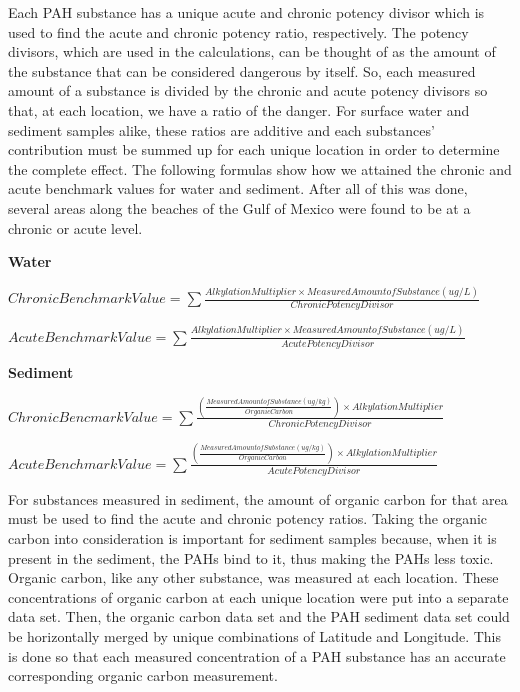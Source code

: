 \documentclass[authoryear,12pt]{elsarticle}
\begin{document}
Each PAH substance has a unique acute and chronic potency divisor which is used to find the acute and chronic potency ratio, respectively. The potency divisors, which are used in the calculations, can be thought of as the amount of the substance that can be considered dangerous by itself. So, each measured amount of a substance is divided by the chronic and acute potency divisors so that, at each location, we have a ratio of the danger. For surface water and sediment samples alike, these ratios are additive and each substances' contribution must be summed up for each unique location in order to determine the complete effect. The following formulas show how we attained the chronic and acute benchmark values for water and sediment. After all of this was done, several areas along the beaches of the Gulf of Mexico were found to be at a chronic or acute level. 
\begin{center} \textbf{Water} \end{center}

$Chronic Benchmark Value = \sum \frac{Alkylation Multiplier \times Measured Amount of Substance (ug/L)}{Chronic Potency Divisor}$

$Acute Benchmark Value = \sum \frac{Alkylation Multiplier \times Measured Amount of Substance (ug/L)}{Acute Potency Divisor}$
\begin{center} \textbf{Sediment} \end{center}

$Chronic Bencmark Value = \sum \frac{(\frac{Measured Amount of Substance (ug/kg)}{Organic Carbon}) \times Alkylation Multiplier}{Chronic Potency Divisor}$

$Acute Benchmark Value = \sum \frac{(\frac{Measured Amount of Substance (ug/kg)}{Organic Carbon}) \times Alkylation Multiplier}{Acute Potency Divisor}$

For substances measured in sediment, the amount of organic carbon for that area must  be used to find the acute and chronic potency ratios. Taking the organic carbon into consideration is important for sediment samples because, when it is present in the sediment, the PAHs bind to it, thus making the PAHs less toxic. Organic carbon, like any other substance, was measured at each location. These concentrations of organic carbon at each unique location were put into a separate data set. Then, the organic carbon data set and the PAH sediment data set could be horizontally merged by unique combinations of Latitude and Longitude. This is done so that each measured concentration of a PAH substance has an accurate corresponding organic carbon measurement. 
\end{document}
